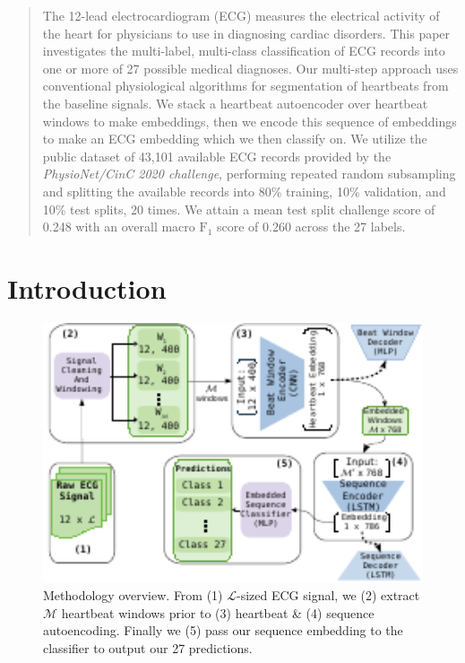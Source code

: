 \documentclass[\main/thesis.tex]{subfiles}
\begin{document}
\begin{abstract}
The 12-lead electrocardiogram (ECG) measures the electrical activity of the heart for physicians to use in diagnosing cardiac disorders.
This paper investigates the multi-label, multi-class classification of ECG records into one or more of 27 possible medical diagnoses.
Our multi-step approach uses conventional physiological algorithms for segmentation of heartbeats from the baseline signals.
We stack a heartbeat autoencoder over heartbeat windows to make embeddings, then we encode this sequence of embeddings to make an ECG embedding which we then classify on.
We utilize the public dataset of 43,101 available ECG records provided by the \emph{PhysioNet/CinC 2020 challenge}, performing repeated random subsampling and splitting the available records into 80\% training, 10\% validation, and 10\% test splits, 20 times.
We attain a mean test split challenge score of 0.248 with an overall macro $\text{F}_1$ score of 0.260 across the 27 labels.
\end{abstract}
%
%
\section{Introduction}

\begin{figure}[t]
    \centering
    \includegraphics[width=12cm]{figure/aenc_methodology.pdf}
    \caption{Methodology overview. From (1) $\mathcal{L}$-sized ECG signal, we (2) extract $\mathcal{M}$ heartbeat windows prior to (3) heartbeat \& (4) sequence autoencoding. Finally we (5) pass our sequence embedding to the classifier to output our 27 predictions.}
    \label{fig:aenc_methodology}
\end{figure}
\end{document}
